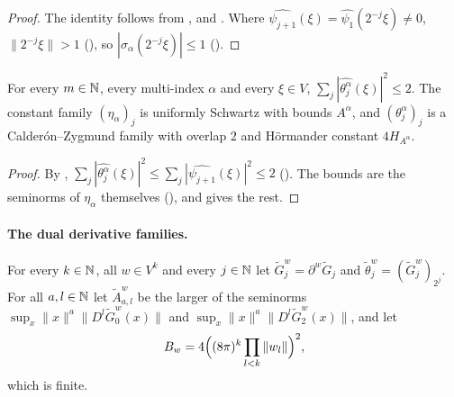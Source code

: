 \begin{proof}
\leanok
The identity follows from ,  and
. Where $\widehat{\psi_{j+1}}(\xi) = \widehat{\psi_1}(2^{-j} \xi) \neq 0$,
$\|2^{-j} \xi\| > 1$ (), so $|\sigma_\alpha(2^{-j} \xi)| \leq 1$
().
\end{proof}

\begin{theorem}
\label{thm:cz-family-derivative}
\leanok
{}
For every $m \in \mathbb{N}$, every multi-index $\alpha$ and every $\xi \in V$,
$\sum_j |\widehat{\theta^\alpha_j}(\xi)|^2 \leq 2$. The constant family $(\eta_\alpha)_j$ is
uniformly Schwartz with bounds $A^\alpha$, and $(\theta^\alpha_j)_j$ is a Calder\'on--Zygmund
family with overlap $2$ and H\"ormander constant $4 H_{A^\alpha}$.
\end{theorem}

\begin{proof}
\leanok
By ,
$\sum_j |\widehat{\theta^\alpha_j}(\xi)|^2 \leq \sum_j |\widehat{\psi_{j+1}}(\xi)|^2 \leq 2$
(). The bounds are the seminorms of $\eta_\alpha$ themselves
(), and  gives the rest.
\end{proof}

\paragraph{The dual derivative families.}

\begin{definition}
\label{def:dual-derivative-family}
\leanok
{}
For every $k \in \mathbb{N}$, all $w \in V^k$ and every $j \in \mathbb{N}$ let
$\tilde G^w_j = \partial^w \tilde G_j$ and $\tilde\theta^w_j = (\tilde G^w_j)_{2^j}$. For all
$a, l \in \mathbb{N}$ let $\tilde A^w_{a,l}$ be the larger of the seminorms
$\sup_x \|x\|^a \|D^l \tilde G^w_0(x)\|$ and $\sup_x \|x\|^a \|D^l \tilde G^w_2(x)\|$, and let
\[
  B_w = 4 \Bigl( (8\pi)^k \prod_{l < k} \|w_l\| \Bigr)^2 ,
\]
which is finite.
\end{definition}

